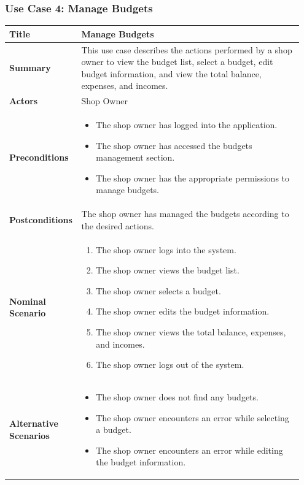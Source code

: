 \subsubsection{Use Case 4: Manage Budgets}
\begin{longtable}{|p{0.2\linewidth}|p{0.75\linewidth}|}
\hline
\textbf{Title} & Manage Budgets \\
\hline
\textbf{Summary} & This use case describes the actions performed by a shop owner to view the budget list, select a budget, edit budget information, and view the total balance, expenses, and incomes. \\
\hline
\textbf{Actors} & Shop Owner \\
\hline
\textbf{Preconditions} & 
\begin{itemize}
    \item The shop owner has logged into the application.
    \item The shop owner has accessed the budgets management section.
    \item The shop owner has the appropriate permissions to manage budgets.
\end{itemize} \\
\hline
\textbf{Postconditions} & The shop owner has managed the budgets according to the desired actions. \\
\hline
\textbf{Nominal Scenario} &
\begin{enumerate}
    \item The shop owner logs into the system.
    \item The shop owner views the budget list.
    \item The shop owner selects a budget.
    \item The shop owner edits the budget information.
    \item The shop owner views the total balance, expenses, and incomes.
    \item The shop owner logs out of the system.
\end{enumerate} \\
\hline
\textbf{Alternative Scenarios} &
\begin{itemize}
    \item The shop owner does not find any budgets.
    \item The shop owner encounters an error while selecting a budget.
    \item The shop owner encounters an error while editing the budget information.
\end{itemize} \\
\hline
\end{longtable}

